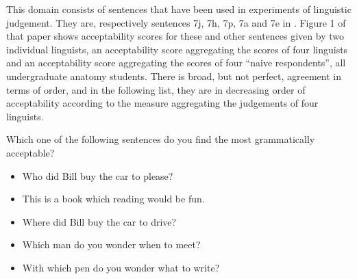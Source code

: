 This domain consists of sentences that have been used in experiments of linguistic judgement.
They are, respectively sentences 7j, 7h, 7p, 7a and 7e in .
Figure 1 of that paper shows acceptability scores for these and other sentences given by two individual linguists, an acceptability score aggregating the scores of four linguists and an acceptability score aggregating the scores of four ``naive respondents'', all undergraduate anatomy students.
There is broad, but not perfect, agreement in terms of order, and in the following list, they are in decreasing order of acceptability according to the measure aggregating the judgements of four linguists.

\begin{tcolorbox}
Which one of the following sentences do you find the most grammatically acceptable?

\begin{itemize}
	\setlength\itemsep{-5pt}
	\item Who did Bill buy the car to please?
	\item This is a book which reading would be fun.
	\item Where did Bill buy the car to drive?
	\item Which man do you wonder when to meet?
	\item With which pen do you wonder what to write?
\end{itemize}
\end{tcolorbox}
